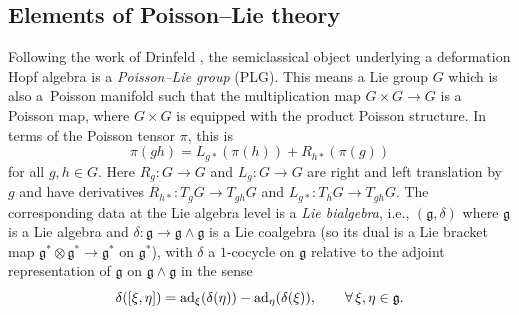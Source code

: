 \documentclass[10pt,a4paper]{amsart}
\numberwithin{equation}{section}
\newcommand{\<}{{\langle}}
\renewcommand{\>}{{\rangle}}
\newcommand{\tens}{\otimes}
\begin{document}
\subsection{Elements of Poisson--Lie theory}\label{PLGprelim}

Following the work of Drinfeld \cite{Drinfeld}, the semiclassical object underlying a deformation Hopf algebra is a {\em Poisson--Lie group} (PLG). This means a Lie group $G$ which is also a~Poisson manifold such that the multiplication map $G\times G\rightarrow G$ is a Poisson map, where $G\times G$ is equipped with the product Poisson structure. In terms of the Poisson tensor $\pi$, this is
\[ \pi(gh)=L_{g*}(\pi(h))+R_{h*}(\pi(g))\]
for all $g,h\in G$. Here $R_g\colon G\to G$ and $L_g\colon G\to G$ are right and left translation by $g$ and have derivatives $R_{h*}\colon T_gG\to T_{gh}G$ and $L_{g*}\colon T_hG\to T_{gh}G$. The corresponding data at the Lie algebra level is a {\em Lie bialgebra}, i.e., $(\mathfrak{g},\delta)$ where $\mathfrak{g}$ is a Lie algebra and $\delta\colon \mathfrak{g}\rightarrow\mathfrak{g}\wedge\mathfrak{g}$ is a Lie coalgebra (so its dual is a Lie bracket map $\mathfrak{g}^*\tens\mathfrak{g}^*\rightarrow\mathfrak{g}^*$ on $\mathfrak{g}^*$), with $\delta$ a $1$-cocycle on $\mathfrak{g}$ relative to the adjoint representation of $\mathfrak{g}$ on $\mathfrak{g}\wedge\mathfrak{g}$ in the sense
\[\delta([\xi,\eta])=\rm{ad}_{\xi}(\delta(\eta))-\rm{ad}_{\eta}(\delta(\xi)),\qquad \forall\, \xi,\eta\in\mathfrak{g}. \]
\end{document}

